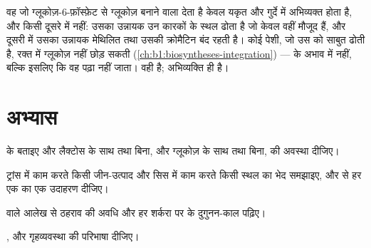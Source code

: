 \begin{example}[दो अंगों में पढ़ा गया एक जीन]\label{ex:b1:expression-control:twoorgans}
वह  जो ग्लूकोज़-6-फ़ॉस्फ़ेट से ग्लूकोज़ बनाने वाला  देता है
केवल यकृत और गुर्दे में अभिव्यक्त होता है, और किसी दूसरे  में नहीं:
उसका उन्नायक उन कारकों के स्थल ढोता है जो केवल वहीं मौजूद हैं, और दूसरी
 में उसका उन्नायक मेथिलित तथा उसकी क्रोमैटिन बंद रहती है। कोई
पेशी, जो उस  को साबुत ढोती है, रक्त में ग्लूकोज़ नहीं छोड़ सकती
(\cref{ch:b1:biosyntheses-integration}) ---  के अभाव में नहीं, बल्कि
इसलिए कि वह  पढ़ा नहीं जाता।  वही है; अभिव्यक्ति ही  है।
\end{example}

\section{अभ्यास}

\begin{exercise}[$\star$]\label{exo:b1:expression-control:1}
 के  बताइए और लैक्टोस के साथ तथा बिना, और ग्लूकोज़ के साथ
तथा बिना,  की अवस्था दीजिए।
\end{exercise}

\begin{exercise}[$\star$]\label{exo:b1:expression-control:2}
ट्रांस में काम करते किसी जीन-उत्पाद और सिस में काम करते किसी स्थल का
भेद समझाइए, और  से हर एक का एक उदाहरण दीजिए।
\end{exercise}

\begin{exercise}[$\star$]\label{exo:b1:expression-control:3}
 वाले आलेख से ठहराव की अवधि और हर शर्करा पर के दुगुनन-काल
पढ़िए।
\end{exercise}

\begin{exercise}[$\star$]\label{exo:b1:expression-control:4}
,  और गृहव्यवस्था  की परिभाषा दीजिए।
\end{exercise}

